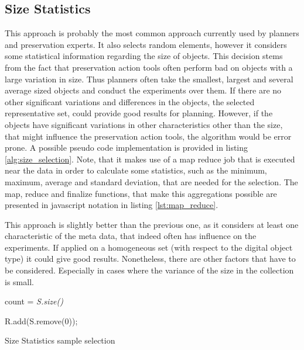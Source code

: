 \subsection{Size Statistics}
This approach is probably the most common approach currently used by planners and preservation experts. It also selects random elements, however it considers some statistical information regarding the size of objects. This decision stems from the fact that preservation action tools often perform bad on objects with a large variation in size. Thus planners often take the smallest, largest and several average sized objects and conduct the experiments over them. If there are no other significant variations and differences in the objects, the selected representative set, could provide good results for planning. However, if the objects have significant variations in other characteristics other than the size, that might influence the preservation action tools, the algorithm would be error prone. A possible pseudo code implementation is provided in listing \ref{alg:size_selection}. Note, that it makes use of a map reduce job that is executed near the data in order to calculate some statistics, such as the minimum, maximum, average and standard deviation, that are needed for the selection. The map, reduce and finalize functions, that make this aggregations possible are presented in javascript notation in listing \ref{lst:map_reduce}.

This approach is slightly better than the previous one, as it considers at least one characteristic of the meta data, that indeed often has influence on the experiments. If applied on a homogeneous set (with respect to the digital object type) it could give good results. Nonetheless, there are other factors that have to be considered. Especially in cases where the variance of the size in the collection is small.

\begin{algorithm}[tbp]
\SetAlgoLined
{}

 \BlankLine

count = \textit{S.size()}\; 
 
  {
    {
   	R.add(S.remove(0));
   }
 }
 \caption{Size Statistics sample selection}
 \label{alg:size_selection}
\end{algorithm}

